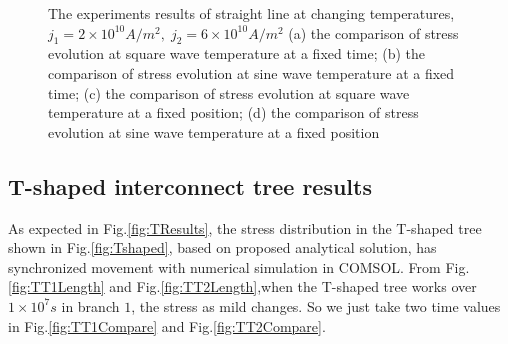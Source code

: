 \begin{figure}[!h]
{\label{fig:ST2Length}}
\caption{The experiments results of straight line at changing temperatures, $j_1=2\times10^{10}A/m^2,\;j_2=6\times10^{10}A/m^2$ (a) the comparison of stress evolution at square wave temperature at a fixed time; (b) the comparison of stress evolution at sine wave temperature at a fixed time; (c) the comparison of stress evolution at square wave temperature at a fixed position; (d) the comparison of stress evolution at sine wave temperature at a fixed position}
\label{fig:SResults}
\end{figure}


\subsection{T-shaped interconnect tree results}
As expected in Fig.\ref{fig:TResults}, the stress distribution in the T-shaped tree shown in Fig.\ref{fig:Tshaped}, based on proposed analytical solution, has synchronized movement with numerical simulation in COMSOL. From Fig.\ref{fig:TT1Length} and Fig.\ref{fig:TT2Length},when the T-shaped tree works over $1\times10^{7}s$ in branch $1$, the stress as mild changes. So we just take two time values in Fig.\ref{fig:TT1Compare} and Fig.\ref{fig:TT2Compare}.
